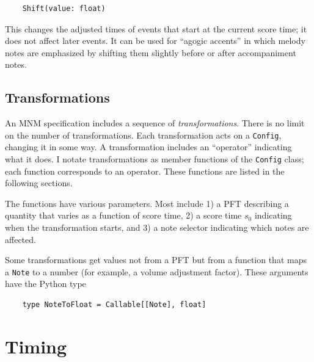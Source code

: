 \documentclass[letterpaper, 12pt]{article}
\begin{document}
\begin{small}\begin{singlespace}\vspace{-18px}\begin{verbatim}
    Shift(value: float)
\end{verbatim}\end{singlespace}\end{small}\vspace{-18px}\noindent
This changes the adjusted times of events that start
at the current score time;
it does not affect later events.
It can be used for ``agogic accents''
in which melody notes are emphasized by
shifting them slightly before or after accompaniment notes.

\subsection{Transformations}

An MNM specification includes a sequence of \textit{transformations}.
There is no limit on the number of transformations.
Each transformation acts on a \texttt{Config}, changing it in some way.
A transformation includes an ``operator'' indicating what it does.
I notate transformations as member functions of the \texttt{Config} class;
each function corresponds to an operator.
These functions are listed in the following sections.

The functions have various parameters.
Most include 1) a PFT describing a quantity
that varies as a function of score time,
2) a score time $ s_0 $ indicating when the transformation starts,
and 3) a note selector indicating which notes are affected.

Some transformations get values not from a PFT
but from a function that maps a \texttt{Note} to a number
(for example, a volume adjustment factor).
These arguments have the Python type
\begin{small}\begin{singlespace}\vspace{-18px}\begin{verbatim}
    type NoteToFloat = Callable[[Note], float]
\end{verbatim}\end{singlespace}\end{small}\vspace{-18px}\noindent

\section{Timing}
\end{document}
